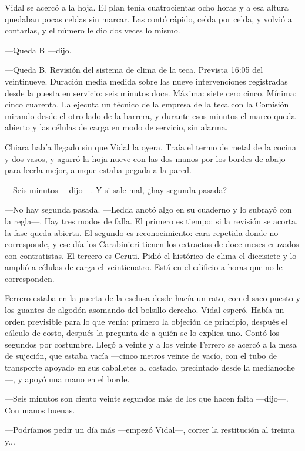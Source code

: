 Vidal se acercó a la hoja. El plan tenía cuatrocientas ocho horas y a esa altura quedaban pocas celdas sin marcar. Las contó rápido, celda por celda, y volvió a contarlas, y el número le dio dos veces lo mismo.

---Queda B ---dijo.

---Queda B. Revisión del sistema de clima de la teca. Prevista 16:05 del veintinueve. Duración media medida sobre las nueve intervenciones registradas desde la puesta en servicio: seis minutos doce. Máxima: siete cero cinco. Mínima: cinco cuarenta. La ejecuta un técnico de la empresa de la teca con la Comisión mirando desde el otro lado de la barrera, y durante esos minutos el marco queda abierto y las células de carga en modo de servicio, sin alarma.

Chiara había llegado sin que Vidal la oyera. Traía el termo de metal de la cocina y dos vasos, y agarró la hoja nueve con las dos manos por los bordes de abajo para leerla mejor, aunque estaba pegada a la pared.

---Seis minutos ---dijo---. Y si sale mal, ¿hay segunda pasada?

---No hay segunda pasada. ---Ledda anotó algo en su cuaderno y lo subrayó con la regla---. Hay tres modos de falla. El primero es tiempo: si la revisión se acorta, la fase queda abierta. El segundo es reconocimiento: cara repetida donde no corresponde, y ese día los Carabinieri tienen los extractos de doce meses cruzados con contratistas. El tercero es Ceruti. Pidió el histórico de clima el diecisiete y lo amplió a células de carga el veinticuatro. Está en el edificio a horas que no le corresponden.

Ferrero estaba en la puerta de la esclusa desde hacía un rato, con el saco puesto y los guantes de algodón asomando del bolsillo derecho. Vidal esperó. Había un orden previsible para lo que venía: primero la objeción de principio, después el cálculo de costo, después la pregunta de a quién se lo explica uno. Contó los segundos por costumbre. Llegó a veinte y a los veinte Ferrero se acercó a la mesa de sujeción, que estaba vacía ---cinco metros veinte de vacío, con el tubo de transporte apoyado en sus caballetes al costado, precintado desde la medianoche---, y apoyó una mano en el borde.

---Seis minutos son ciento veinte segundos más de los que hacen falta ---dijo---. Con manos buenas.

---Podríamos pedir un día más ---empezó Vidal---, correr la restitución al treinta y...

